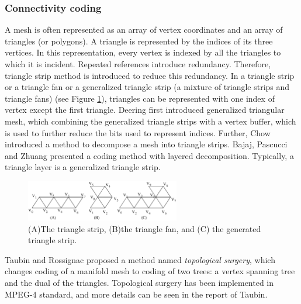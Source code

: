 \documentclass[11pt, a4paper]{report}
\begin{document}
    \subsubsection*{Connectivity coding}
    A mesh is often represented as an array of vertex coordinates and 
    an array of triangles (or polygons). A triangle is represented by 
    the indices of its three vertices.
    In this representation, every vertex is indexed by all the
    triangles to which it is incident. Repeated references introduce
    redundancy. Therefore, triangle strip method is introduced to
    reduce this redundancy. In a triangle strip or a triangle fan or a
    generalized triangle strip (a mixture of triangle strips and
    triangle fans) (see Figure \ref{strip}), 
    triangles can be represented with one index of vertex
    except the first triangle. 
    Deering \cite{218391} first introduced generalized triangular mesh, 
    which combining the generalized triangle strips with a vertex buffer,
    which is used to further reduce the bits used to represent indices. 
    Further, Chow \cite{267103} introduced a method to
    decompose a mesh into triangle strips. 
    Bajaj, Pascucci and Zhuang \cite{789628} presented a coding method with layered
    decomposition. 
    Typically, a triangle layer is a generalized triangle strip. 
    \begin{figure}[ht]
    \centering
    \includegraphics[width=0.6\textwidth]{strip.eps}
    \caption{(A)The triangle strip, (B)the triangle fan, and (C) the generated triangle strip.}\label{strip}
    \end{figure}

    Taubin and Rossignac \cite{274365} proposed a method named
    \emph{topological surgery}, which changes coding of a manifold
    mesh to coding of two trees: 
    a vertex spanning tree and the dual of the triangles.
    Topological surgery has been implemented in MPEG-4 standard, and more details
    can be seen in the report of Taubin\cite{3d:Taubin}.
    
\end{document}
